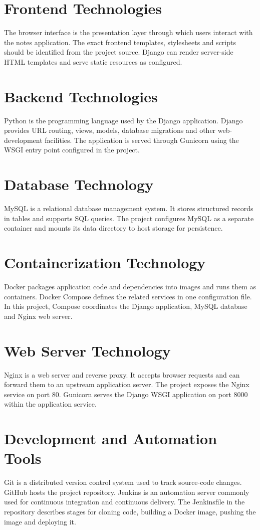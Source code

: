 \documentclass[12pt,a4paper,oneside]{report}
\begin{document}
\section{Frontend Technologies}
The browser interface is the presentation layer through which users interact with the notes application. The exact frontend templates, stylesheets and scripts should be identified from the project source. Django can render server-side HTML templates and serve static resources as configured.

\section{Backend Technologies}
Python is the programming language used by the Django application. Django provides URL routing, views, models, database migrations and other web-development facilities. The application is served through Gunicorn using the WSGI entry point configured in the project.

\section{Database Technology}
MySQL is a relational database management system. It stores structured records in tables and supports SQL queries. The project configures MySQL as a separate container and mounts its data directory to host storage for persistence.

\section{Containerization Technology}
Docker packages application code and dependencies into images and runs them as containers. Docker Compose defines the related services in one configuration file. In this project, Compose coordinates the Django application, MySQL database and Nginx web server.

\section{Web Server Technology}
Nginx is a web server and reverse proxy. It accepts browser requests and can forward them to an upstream application server. The project exposes the Nginx service on port 80. Gunicorn serves the Django WSGI application on port 8000 within the application service.

\section{Development and Automation Tools}
Git is a distributed version control system used to track source-code changes. GitHub hosts the project repository. Jenkins is an automation server commonly used for continuous integration and continuous delivery. The Jenkinsfile in the repository describes stages for cloning code, building a Docker image, pushing the image and deploying it.
\end{document}

